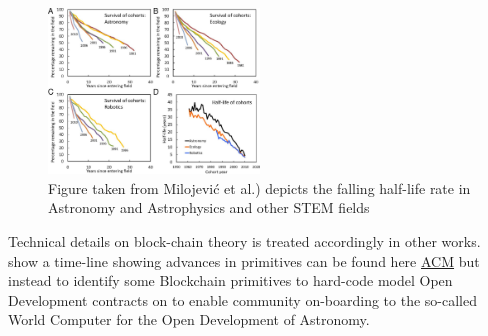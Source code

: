 \documentclass[final,5p,times,twocolumn,authoryear]{elsarticle}
\begin{document}
\begin{figure}[h!]
    \centering
    \label{fig:F4.large}
  \caption{Figure taken from Milojević et al.) depicts the falling half-life rate in Astronomy and Astrophysics and other STEM fields}
  \includegraphics[width=0.5\textwidth]{figs/F4.large.jpg}
\end{figure}

Technical details on block-chain theory is treated accordingly in other works.  \cite{20d30b4efb014b21b7ab27f5218692ab} show a time-line showing advances in primitives can be found here \href{https://queue.acm.org/detail.cfm?id=3136559}{ACM} but instead to identify some Blockchain primitives to hard-code model Open Development contracts on to enable community on-boarding to the so-called World Computer for the Open Development of Astronomy.
\end{document}
